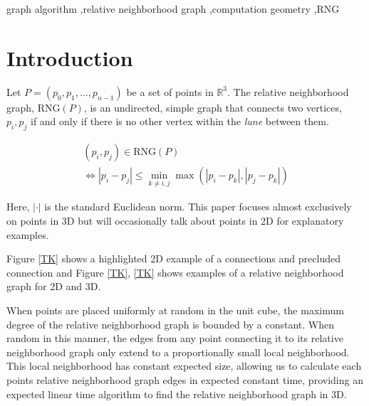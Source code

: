 \documentclass[a4paper,fleqn]{cas-dc}
\begin{document}

\begin{keywords}
  graph algorithm \sep relative neighborhood graph \sep computation geometry \sep RNG

\end{keywords}


\maketitle

\section{Introduction}

Let $P = (p _ 0, p _ 1, \dots, p _ {n-1})$ be a set of points in $\mathbb{R}^3$.
The relative neighborhood graph, $\text{RNG}(P)$, is an undirected, simple graph that connects two vertices,
$p _ i, p _ j$ if and only if there is no other vertex within the \emph{lune} between
them.

$$
\begin{array}{l}
  (p _ i, p _ j) \in \text{RNG}(P) \\
  \iff |p _ i - p _ j| \le \min _ { k \ne i,j } \max ( |p _ i - p _ k|, |p _ j - p _ k| )
\end{array}
$$

Here, $|\cdot|$ is the standard Euclidean norm.
This paper focuses almost exclusively on points in 3D but will occasionally talk about
points in 2D for explanatory examples.

Figure \ref{TK} shows a highlighted 2D example of a connections and precluded connection
and Figure \ref{TK}, \ref{TK} shows examples of a relative neighborhood graph for 2D and 3D.

When points are placed uniformly at random in the unit cube, the maximum
degree of the relative neighborhood graph is bounded by a constant.
When random in this manner, the edges from any point connecting it to its relative
neighborhood graph only extend to a proportionally small local neighborhood.
This local neighborhood has constant expected size, allowing us to calculate
each points relative neighborhood graph edges in expected constant time, providing an expected linear time algorithm
to find the relative neighborhood graph in 3D.
\end{document}
